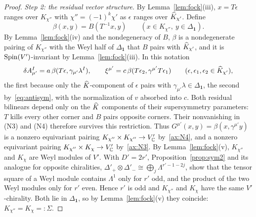 \begin{proof}
\emph{Step 2: the residual vector structure.} By Lemma~\ref{lem:fock}(iii), $x=T\epsilon$ ranges over $K_{\chi''}$ with $\chi''=(-1)^k\chi'$ as $\epsilon$ ranges over $\widehat{K}_{\chi'}$. Define
\begin{equation}
\label{eq:beta}
\beta(x,y)=B(T^{-1}x,y)\qquad(x\in K_{\chi''},\ y\in\Delta_{\mathbf 1}).
\end{equation}
By Lemma~\ref{lem:fock}(iv) and the nondegeneracy of $B$, $\beta$ is a nondegenerate pairing of $K_{\chi''}$ with the Weyl half of $\Delta_{\mathbf 1}$ that $B$ pairs with $\widehat{K}_{\chi'}$, and it is $\operatorname{Spin}(V')$-invariant by Lemma~\ref{lem:fock}(iii). In this notation
\begin{equation}
\label{eq:dAxi}
\delta A^I_{\mu'}=a\,\beta(T\epsilon,\gamma_{\mu'}\lambda^I),\qquad \xi^{\mu'}=c\,\beta(T\epsilon_2,\gamma^{\mu'}T\epsilon_1)\qquad(\epsilon,\epsilon_1,\epsilon_2\in\widehat{K}_{\chi'}),
\end{equation}
the first because only the $\widehat{K}$-component of $\epsilon$ pairs with $\gamma_{\mu'}\lambda\in\Delta_{\mathbf 1}$, the second by~\eqref{eq:antisym}, with the normalization of $v$ absorbed into $c$. Both residual bilinears depend only on the $\widehat{K}$ components of their supersymmetry parameters: $T$ kills every other corner and $B$ pairs opposite corners. Their nonvanishing in (N3) and (N4) therefore survives this restriction. Thus $G^{\mu'}(x,y)=\beta(x,\gamma^{\mu'}y)$ is a nonzero equivariant pairing $K_{\chi''}\times K_{\chi''}\to V'_{\mathbb{C}}$ by~\ref{ax:N4}, and a nonzero equivariant pairing $K_{\chi''}\times K_\chi\to V'_{\mathbb{C}}$ by~\ref{ax:N3}. By Lemma~\ref{lem:fock}(v), $K_{\chi''}$ and $K_\chi$ are Weyl modules of $V'$. With $D'=2r'$, Proposition~\ref{prop:sym2} and its analogue for opposite chiralities, $\Delta'_+\otimes\Delta'_-\cong\bigoplus_j\Lambda^{r'-1-2j}$, show that the tensor square of a Weyl module contains $\Lambda^1$ only for $r'$ odd, and the product of the two Weyl modules only for $r'$ even. Hence $r'$ is odd and $K_{\chi''}$ and $K_\chi$ have the same $V'$-chirality. Both lie in $\Delta_{\mathbf 1}$, so by Lemma~\ref{lem:fock}(v) they coincide: $K_{\chi''}=K_\chi=:\Sigma$.


\end{proof}

